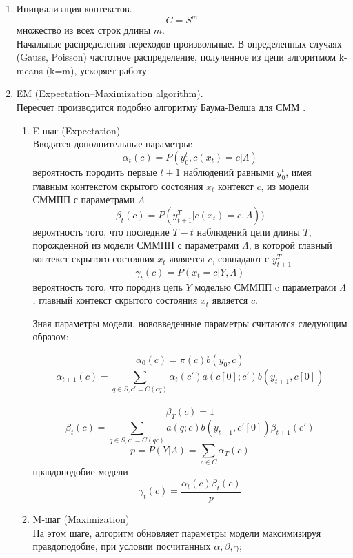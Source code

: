 \documentclass{matmex-diploma-custom}
\begin{document}
\begin{enumerate}
\item Инициализация контекстов.
$$ C = S^{m}$$
множество из всех строк длины $m$.
\\
Начальные распределения переходов произвольные.
В определенных случаях (Gauss, Poisson) частотное распределение, полученное из цепи алгоритмом k-means (k=m), ускоряет работу
\\
\item EM (Expectation–Maximization algorithm).
\\
Пересчет производится подобно алгоритму Баума-Велша для СММ \cite{Rabiner1989}.
\\
\begin{enumerate}
\item E-шаг (Expectation)\\
Вводятся дополнительные параметры:
$$ \alpha_{t}(c) = P(y_{0}^{t}, c(x_{t})=c| \Lambda)$$
вероятность породить первые $t+1$ наблюдений равными $y_{0}^{t}$, имея главным контекстом  скрытого состояния $x_{t}$ контекст $ c $, из модели СММПП с параметрами $\Lambda$
\\
$$ \beta_{t}(c) = P(y_{t+1}^{T}| c(x_{t})=c, \Lambda))$$
вероятность того, что последние $T-t$ наблюдений цепи длины $T$, порожденной из модели СММПП с параметрами $\Lambda$, в которой главный контекст скрытого состояния $x_{t}$ является $ c $, совпадают с $y_{t+1}^{T}$
\\
$$ \gamma_{t}(c) = P(x_{t}=c|Y,\Lambda) $$ 
вероятность того, что породив цепь $Y$ моделью СММПП c параметрами $\Lambda$,
главный контекст скрытого состояния $ x_{t} $ является $c$. 

Зная параметры модели, нововведенные параметры считаются следующим образом:
\begin{center}
$$ \alpha_{0}(c) = \pi(c)b(y_{0},c)$$ 
$$ \alpha_{t+1}(c) = \sum_{q \in S, c'=C(cq)}{\alpha_{t}(c')a(c[0];c')b(y_{t+1},c[0])}$$
\\
$$ \beta_{T}(c) = 1$$ 
$$ \beta_{t}(c) = \sum_{q \in S, c'=C(qc)}{a(q;c)b(y_{t+1}, c'[0])\beta_{t+1}(c')}$$
$$p = P(Y|\Lambda) = \sum_{c \in C}\alpha_{T}(c)$$
правдоподобие модели
\\ 
$$ \gamma_{t}(c) = \frac{\alpha_{t}(c)\beta_{t}(c)}{p}$$
\end{center}
\item M-шаг (Maximization)\\
На этом шаге, алгоритм обновляет параметры модели максимизируя правдоподобие, при условии посчитанных $\alpha, \beta, \gamma$;


\end{enumerate}
\end{enumerate}
\end{document}
